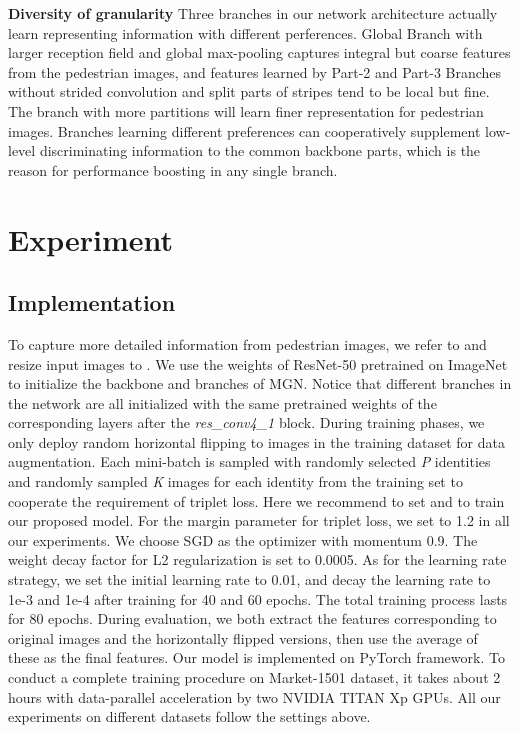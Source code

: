 \documentclass[sigconf]{acmart}
\begin{document}
\textbf{Diversity of granularity} Three branches in our network architecture actually learn representing information with different perferences. Global Branch with larger reception field and global max-pooling captures integral but coarse features from the pedestrian images, and features learned by Part-2 and Part-3 Branches without strided convolution and split parts of stripes tend to be local but fine. The branch with more partitions will learn finer representation for pedestrian images. Branches learning different preferences can cooperatively supplement low-level discriminating information to the common backbone parts, which is the reason for performance boosting in any single branch. 

\section{Experiment}
\subsection{Implementation}
To capture more detailed information from pedestrian images, we refer to \cite{sun2017beyond} and resize input images to .  We use the weights of ResNet-50 pretrained on ImageNet \cite{deng2009imagenet} to initialize the backbone and branches of MGN. Notice that different branches in the network are all initialized with the same pretrained weights of the corresponding layers after the \textit{res\_conv4\_1} block. During training phases, we only deploy random horizontal flipping to images in the training dataset for data augmentation. Each mini-batch is sampled with randomly selected \textit{P} identities and randomly sampled \textit{K} images for each identity from the training set to cooperate the requirement of triplet loss. Here we recommend to set  and  to train our proposed model. For the margin parameter for triplet loss, we set to 1.2 in all our experiments. We choose SGD as the optimizer with momentum 0.9. The weight decay factor for L2 regularization is set to 0.0005. As for the learning rate strategy, we set the initial learning rate to 0.01, and decay the learning rate to 1e-3 and 1e-4 after training for 40 and 60 epochs. The total training process lasts for 80 epochs. During evaluation, we both extract the features corresponding to original images and the horizontally flipped versions, then use the average of these as the final features. Our model is implemented on PyTorch framework. To conduct a complete training procedure on Market-1501 dataset, it takes about 2 hours with data-parallel acceleration by two NVIDIA TITAN Xp GPUs. All our experiments on different datasets follow the settings above.
\end{document}
